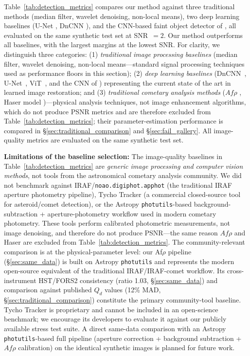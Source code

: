 \documentclass[usenatbib]{mnras}
\begin{document}
Table~\ref{tab:detection_metrics} compares our method against three traditional methods (median filter, wavelet denoising, non-local means), two deep learning baselines (U-Net \citealt{ronneberger15}, DnCNN \citealt{zhang17}), and the CNN-based faint object detector of \citet{jiang23}, all evaluated on the same synthetic test set at SNR~$=2$. Our method outperforms all baselines, with the largest margins at the lowest SNR. For clarity, we distinguish three categories: (1) \textit{traditional image processing baselines} (median filter, wavelet denoising, non-local means---standard signal processing techniques used as performance floors in this section); (2) \textit{deep learning baselines} (DnCNN~\citealt{zhang17}, U-Net~\citealt{ronneberger15}, ViT~\citealt{dosovitskiy21}, and the CNN of \citet{jiang23}) representing the current state of the art in learned image restoration; and (3) \textit{traditional cometary analysis methods} ($Af\rho$ \citep{ahearn95}, Haser model \citep{haser57})---physical analysis techniques, not image enhancement algorithms, which do not produce PSNR metrics and are therefore excluded from Table~\ref{tab:detection_metrics}; their parameter-estimation performance is compared in \S\ref{sec:traditional_comparison} and \S\ref{sec:fail_gallery}. All image-quality metrics are evaluated on the same synthetic test set.

\textbf{Limitations of the baseline selection:} The image-quality baselines in Table~\ref{tab:detection_metrics} are \textit{generic image processing and computer vision methods}, not tools from the astronomical cometary analysis community. We did not benchmark against IRAF/\texttt{noao.digiphot.apphot} (the traditional IRAF aperture photometry pipeline), Tycho Tracker (a commercial closed-source tool for asteroid/comet detection), or the Astropy \texttt{photutils}-based background-subtraction + aperture-photometry workflow used in modern cometary photometry. These tools perform calibrated photometric measurements, not image denoising, and therefore do not produce PSNR---the same reason $Af\rho$ and Haser are excluded from Table~\ref{tab:detection_metrics}. The community-relevant comparison is at the physical-parameter level: our Af$\rho$ pipeline (\S\ref{sec:same_data}) is built on Astropy \texttt{photutils} and represents the modern open-source equivalent of the traditional IRAF/IRAF-comet workflow. Its cross-instrument HST/FORS2 consistency (ratio 1.03, \S\ref{sec:same_data}) and comparison against published $Q_d$ values (12\% MAD, \S\ref{sec:traditional_comparison}) constitute the primary community-tool baseline. Tycho Tracker is proprietary and cannot be included in an open-science benchmark; we encourage its developers to evaluate it against our publicly available stress test suite. A direct same-data comparison with an Astropy \texttt{photutils}-based full pipeline (aperture correction + background subtraction + $Af\rho$ calibration) on the identical synthetic images is planned for future work.
\end{document}
